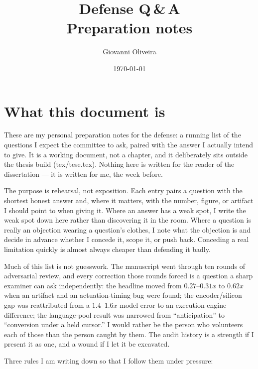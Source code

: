 \documentclass[11pt,a4paper]{article}
\title{Defense Q\,\&\,A\\[0.5ex]
{\large Preparation notes}}
\author{Giovanni Oliveira}
\date{\today}
\def\times{x}\def\rho{rho}\def\approx{~}\def\leq{<=}\def\geq{>=}%
\def\emph#1{#1}\def\texttt#1{#1}%
\begin{document}
\maketitle

\section*{What this document is}

These are my personal preparation notes for the defense: a running list of the
questions I expect the committee to ask, paired with the answer I actually
intend to give. It is a working document, not a chapter, and it deliberately
sits outside the thesis build (\texttt{tex/tese.tex}). Nothing here is written
for the reader of the dissertation --- it is written for me, the week before.

The purpose is rehearsal, not exposition. Each entry pairs a question with the
shortest honest answer and, where it matters, with the number, figure, or
artifact I should point to when giving it. Where an answer has a weak spot, I
write the weak spot down here rather than discovering it in the room. Where a
question is really an objection wearing a question's clothes, I note what the
objection is and decide \emph{in advance} whether I concede it, scope it, or
push back. Conceding a real limitation quickly is almost always cheaper than
defending it badly.

Much of this list is not guesswork. The manuscript went through ten rounds of
adversarial review, and every correction those rounds forced is a question a
sharp examiner can ask independently: the headline moved from
$0.27$--$0.31\times$ to $0.62\times$ when an artifact and an actuation-timing
bug were found; the encoder/silicon gap was reattributed from a
$1.4$--$1.6\times$ model error to an execution-engine difference; the
language-pool result was narrowed from ``anticipation'' to ``conversion under a
held cursor.'' I would rather be the person who volunteers each of those than
the person caught by them. The audit history is a strength if I present it as
one, and a wound if I let it be excavated.

Three rules I am writing down so that I follow them under pressure:
\end{document}
